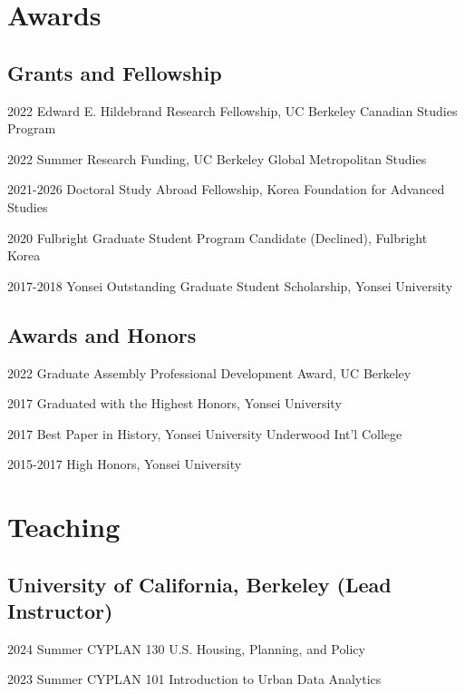 \documentclass[12pt,letterpaper]{report}
\begin{document}
\section*{Awards}
    \subsection*{Grants and Fellowship}
    \begin{tablist}
        \item[2022] \tab{}Edward E. Hildebrand Research Fellowship, UC Berkeley Canadian Studies Program
        \item[2022] \tab{}Summer Research Funding, UC Berkeley Global Metropolitan Studies
        \item[2021-2026] \tab{}Doctoral Study Abroad Fellowship, Korea Foundation for Advanced Studies
        \item[2020] \tab{}Fulbright Graduate Student Program Candidate (Declined), Fulbright Korea
        \item[2017-2018] \tab{}Yonsei Outstanding Graduate Student Scholarship, Yonsei University
    \end{tablist}
    \subsection*{Awards and Honors}
    \begin{tablist}
        \item[2022] \tab{}Graduate Assembly Professional Development Award, UC Berkeley
        \item[2017] \tab{}Graduated with the Highest Honors, Yonsei University
        \item[2017] \tab{}Best Paper in History, Yonsei University Underwood Int'l College
        \item[2015-2017] \tab{}High Honors, Yonsei University
    \end{tablist}


  \section*{Teaching}
    \subsection*{University of California, Berkeley (Lead Instructor)}
    \begin{tablist}
        \item[2024 Summer] \tab{}CYPLAN 130 U.S. Housing, Planning, and Policy
        \item[2023 Summer] \tab{}CYPLAN 101 Introduction to Urban Data Analytics
    \end{tablist}
\end{document}

